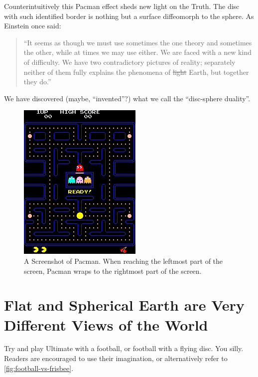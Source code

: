 \documentclass{article}
\begin{document}
Counterintuitively this Pacman effect sheds new light on the Truth. The disc
with such identified border is nothing but a surface diffeomorph to the sphere.
As Einstein once said:

\begin{quote}
``It seems as though we must use sometimes the one theory and sometimes the
other, while at times we may use either. We are faced with a new kind of
difficulty. We have two contradictory pictures of reality; separately neither
of them fully explains the phenomena of \sout{light} Earth, but together they do.''
\end{quote}

We have discovered (maybe, ``invented''?) what we call the ``disc-sphere duality''.

\begin{figure}[t]
  \centering
  \includegraphics{images/pacman.png}
  \caption{A Screenshot of Pacman. When reaching the leftmost part of the
    screen, Pacman wraps to the rightmost part of the screen.}
  \label{fig:pacman-screenshot}
\end{figure}

\section{Flat and Spherical Earth are Very Different Views of the World}
Try and play Ultimate with a football, or football with a flying disc. You silly.
Readers are encouraged to use their imagination, or alternatively refer to
\cref{fig:football-vs-frisbee}.
\end{document}
